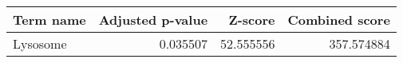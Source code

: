 \begin{tabular}{lrrr}
\toprule
Term name &  Adjusted p-value &   Z-score &  Combined score \\
\midrule
 Lysosome &          0.035507 & 52.555556 &      357.574884 \\
\bottomrule
\end{tabular}
